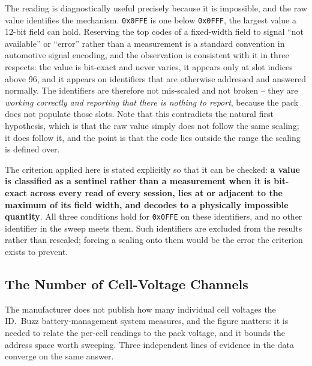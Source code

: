 \documentclass[11pt,a4paper,oneside,parskip=half]{scrreprt}
\providecommand{\hex}{}\renewcommand{\hex}[1]{\texttt{0x#1}}
\begin{document}
The reading is diagnostically useful precisely because it is impossible, and the raw value identifies the mechanism. \hex{0FFE} is one below \hex{0FFF}, the largest value a 12-bit field can hold. Reserving the top codes of a fixed-width field to signal ``not available'' or ``error'' rather than a measurement is a standard convention in automotive signal encoding, and the observation is consistent with it in three respects: the value is bit-exact and never varies, it appears only at slot indices above 96, and it appears on identifiers that are otherwise addressed and answered normally. The identifiers are therefore not mis-scaled and not broken -- they are \emph{working correctly and reporting that there is nothing to report}, because the pack does not populate those slots. Note that this contradicts the natural first hypothesis, which is that the raw value simply does not follow the same scaling; it does follow it, and the point is that the code lies outside the range the scaling is defined over.

The criterion applied here is stated explicitly so that it can be checked: \textbf{a value is classified as a sentinel rather than a measurement when it is bit-exact across every read of every session, lies at or adjacent to the maximum of its field width, and decodes to a physically impossible quantity}. All three conditions hold for \hex{0FFE} on these identifiers, and no other identifier in the sweep meets them. Such identifiers are excluded from the results rather than rescaled; forcing a scaling onto them would be the error the criterion exists to prevent.

\subsection{The Number of Cell-Voltage Channels}
\label{ssec:cellcount}
The manufacturer does not publish how many individual cell voltages the ID.~Buzz battery-management system measures, and the figure matters: it is needed to relate the per-cell readings to the pack voltage, and it bounds the address space worth sweeping. Three independent lines of evidence in the data converge on the same answer.
\end{document}
